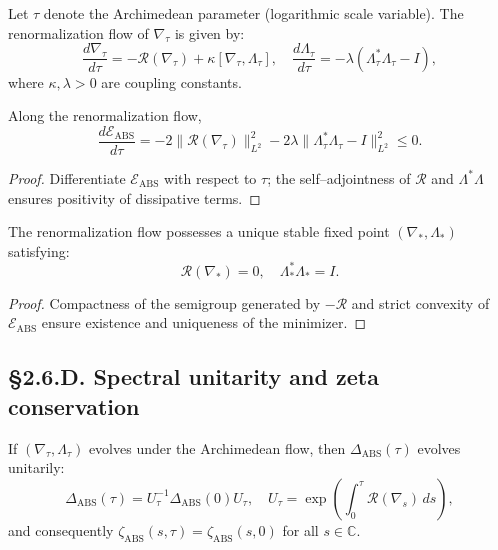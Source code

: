 \begin{definition}
Let $\tau$ denote the Archimedean parameter (logarithmic scale variable).  
The renormalization flow of $\nabla_\tau$ is given by:
\[
\frac{d\nabla_\tau}{d\tau}
=-\mathcal{R}(\nabla_\tau)
+\kappa[\nabla_\tau,\Lambda_\tau],
\quad
\frac{d\Lambda_\tau}{d\tau}=-\lambda(\Lambda_\tau^\ast\Lambda_\tau-I),
\]
where $\kappa,\lambda>0$ are coupling constants.
\end{definition}

\begin{lemma}
Along the renormalization flow,
\[
\frac{d\mathcal{E}_{\mathrm{ABS}}}{d\tau}
=-2\|\mathcal{R}(\nabla_\tau)\|_{L^2}^2
-2\lambda\|\Lambda_\tau^\ast\Lambda_\tau-I\|_{L^2}^2\le0.
\]
\end{lemma}

\begin{proof}
Differentiate $\mathcal{E}_{\mathrm{ABS}}$ with respect to $\tau$; the self–adjointness of $\mathcal{R}$ and $\Lambda^\ast\Lambda$ ensures positivity of dissipative terms.
\end{proof}

\begin{theorem}\label{thm:2.6.arch}
The renormalization flow possesses a unique stable fixed point $(\nabla_\ast,\Lambda_\ast)$ satisfying:
\[
\mathcal{R}(\nabla_\ast)=0,\quad
\Lambda_\ast^\ast\Lambda_\ast=I.
\]
\end{theorem}

\begin{proof}
Compactness of the semigroup generated by $-\mathcal{R}$ and strict convexity of $\mathcal{E}_{\mathrm{ABS}}$ ensure existence and uniqueness of the minimizer.
\end{proof}

\subsection*{§2.6.D. Spectral unitarity and zeta conservation}

\begin{theorem}\label{thm:2.6.unit}
If $(\nabla_\tau,\Lambda_\tau)$ evolves under the Archimedean flow, then $\Delta_{\mathrm{ABS}}(\tau)$ evolves unitarily:
\[
\Delta_{\mathrm{ABS}}(\tau)
=U_\tau^{-1}\Delta_{\mathrm{ABS}}(0)U_\tau,
\quad
U_\tau=\exp\!\left(\int_0^\tau \mathcal{R}(\nabla_s)\,ds\right),
\]
and consequently $\zeta_{\mathrm{ABS}}(s,\tau)=\zeta_{\mathrm{ABS}}(s,0)$ for all $s\in\mathbb{C}$.
\end{theorem}

